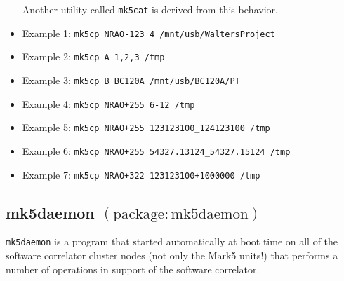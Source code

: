 \begin{itemize}
Another utility called {\tt mk5cat} is derived from this behavior.
\item[] Example 1: {\tt mk5cp NRAO-123 4 /mnt/usb/WaltersProject}
\item[] Example 2: {\tt mk5cp A 1,2,3 /tmp}
\item[] Example 3: {\tt mk5cp B BC120A /mnt/usb/BC120A/PT}
\item[] Example 4: {\tt mk5cp NRAO+255 6-12 /tmp}
\item[] Example 5: {\tt mk5cp NRAO+255 123123100\_124123100 /tmp}
\item[] Example 6: {\tt mk5cp NRAO+255 54327.13124\_54327.15124 /tmp}
\item[] Example 7: {\tt mk5cp NRAO+322 123123100+1000000 /tmp}
\end{itemize}









\subsection{mk5daemon {\small $\mathrm{(package: mk5daemon)}$}} \label{sec:mk5daemon} 

{\tt mk5daemon} is a program that started automatically at boot time on all of the software correlator cluster nodes (not only the Mark5 units!) that performs a number of operations in support of the software correlator.

